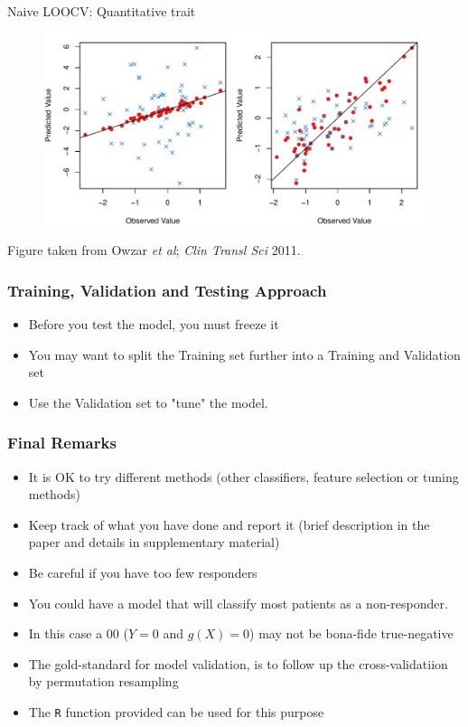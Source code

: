 \documentclass[xcolor=x11names,compress]{beamer}\usepackage[]{graphicx}\usepackage[]{color}
\begin{document}
\begin{frame}{Naive LOOCV: Quantitative trait}
  \begin{figure}
    \centering
    \includegraphics[scale=0.65]{Figures/lm-overfit.pdf}
  \end{figure}
Figure taken from Owzar {\it et al}; {\it Clin Transl Sci} 2011. 
\end{frame}


\begin{frame}
  \frametitle{Training, Validation and Testing Approach}
  \begin{itemize}
  \item Before you test the model, you must freeze it
  \item You may want to split the Training set further into
        a Training and Validation set
  \item Use the Validation set to "tune" the model.
  \end{itemize}
\end{frame}

\begin{frame}
  \frametitle{Final Remarks}
  \begin{itemize}
  \item It is OK to try different methods (other classifiers, feature selection or tuning methods)
  \item Keep track of what you have done and report it (brief description in the paper and details in 
        supplementary material)
  \item Be careful if you have too few responders
  \item You could have a model that will classify most patients as a non-responder.
  \item In this case a 00 ($Y=0$ and $g(X)=0$) may not be bona-fide true-negative
  \item The gold-standard for model validation, is to follow up the cross-validatiion by permutation resampling
    \item The {\tt R} function provided can be used for this purpose
\end{itemize}
\end{frame}
\end{document}
